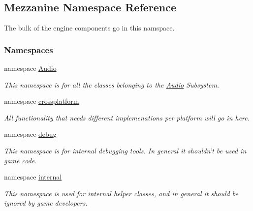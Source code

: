 \hypertarget{namespaceMezzanine}{
\subsection{Mezzanine Namespace Reference}
\label{namespaceMezzanine}
}


The bulk of the engine components go in this namspace.  


\subsubsection*{Namespaces}
\begin{DoxyCompactItemize}
\item 
namespace \hyperlink{namespaceMezzanine_1_1Audio}{Audio}


\begin{DoxyCompactList}\small\item\em This namespace is for all the classes belonging to the \hyperlink{namespaceMezzanine_1_1Audio}{Audio} Subsystem. \item\end{DoxyCompactList}

\item 
namespace \hyperlink{namespaceMezzanine_1_1crossplatform}{crossplatform}


\begin{DoxyCompactList}\small\item\em All functionality that needs different implemenations per platform will go in here. \item\end{DoxyCompactList}

\item 
namespace \hyperlink{namespaceMezzanine_1_1debug}{debug}


\begin{DoxyCompactList}\small\item\em This namespace is for internal debugging tools. In general it shouldn't be used in game code. \item\end{DoxyCompactList}

\item 
namespace \hyperlink{namespaceMezzanine_1_1internal}{internal}


\begin{DoxyCompactList}\small\item\em This namespace is used for internal helper classes, and in general it should be ignored by game developers. \item\end{DoxyCompactList}


\end{DoxyCompactItemize}
